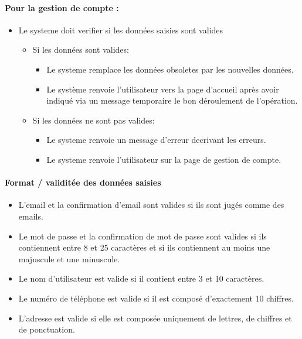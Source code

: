 \documentclass{article}
\begin{document}
\paragraph{Pour la gestion de compte : }
\begin{itemize}
\item Le systeme doit verifier si les données saisies sont valides
	\begin{itemize}
	\item Si les données sont valides:
		\begin{itemize}
		\item Le systeme remplace les données obsoletes par
                  les nouvelles données.
                \item Le système renvoie l'utilisateur vers la page d'accueil
                 après avoir indiqué via un message temporaire le bon déroulement de l'opération.
		\end{itemize}
		\item Si les données ne sont pas valides:
		\begin{itemize}
		\item Le systeme renvoie un message d'erreur decrivant
                  les erreurs.
                \item Le systeme renvoie l'utilisateur sur la page de
                  gestion de compte.
		\end{itemize}
	\end{itemize}
\end{itemize}

\paragraph{Format / validitée des données saisies}
\begin{itemize}
\item L'email et la confirmation d'email sont valides si ils sont jugés comme des emails.

\item Le mot de passe et la confirmation de mot de passe sont valides si ils contiennent entre 8 et 25
  caractères et si ils contiennent au moins une majuscule et une minuscule.

\item Le nom d'utilisateur est valide si il contient entre 3 et 10
  caractères.

\item Le numéro de téléphone est valide si il est composé d'exactement
  10 chiffres.

\item L'adresse est valide si elle est composée uniquement de lettres,
  de chiffres et de ponctuation.
\end{itemize}
\end{document}
